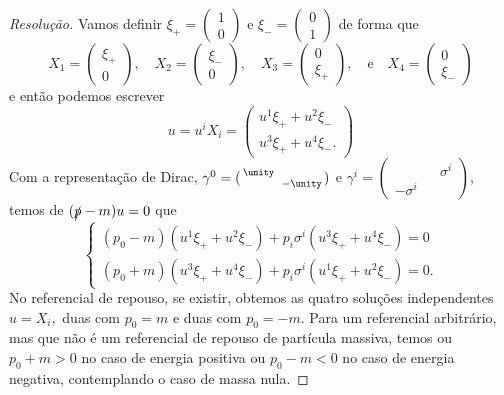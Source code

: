 \begin{proof}[Resolução]
    Vamos definir \(\xi_+ = (\begin{smallmatrix} 1\\0 \end{smallmatrix})\) e \(\xi_- = (\begin{smallmatrix}0\\1 \end{smallmatrix})\) de forma que
    \begin{equation*}
        X_1 = \begin{pmatrix}
            \xi_+\\0
        \end{pmatrix},\quad
        X_2 = \begin{pmatrix}
            \xi_-\\0
        \end{pmatrix},\quad
        X_3 = \begin{pmatrix}
            0\\\xi_+
        \end{pmatrix},\quad\text{e}\quad
        X_4 = \begin{pmatrix}
            0\\\xi_-
        \end{pmatrix}
    \end{equation*}
    e então podemos escrever
    \begin{equation*}
        u = u^i X_i = \begin{pmatrix}
            u^1 \xi_+ + u^2 \xi_-\\
            u^3 \xi_+ + u^4 \xi_-.
        \end{pmatrix}
    \end{equation*}
    Com a representação de Dirac, \(\gamma^0 = (\begin{smallmatrix} \unity &&\\ &&-\unity \end{smallmatrix})\) e \(\gamma^i = (\begin{smallmatrix} && \sigma^i\\ -\sigma^i && \end{smallmatrix})\), temos de \((\slashed{p} - m)u = 0\) que
    \begin{equation*}
        \begin{cases}
            (p_0 - m) (u^1 \xi_+ + u^2 \xi_-) + p_i \sigma^i (u^3 \xi_+ + u^4 \xi_-) = 0\\
            (p_0 + m) (u^3 \xi_+ + u^4 \xi_-) + p_i \sigma^i (u^1 \xi_+ + u^2 \xi_-) = 0.
        \end{cases}
    \end{equation*}
    No referencial de repouso, se existir, obtemos as quatro soluções independentes \(u = X_i,\) duas com \(p_0 = m\) e duas com \(p_0 = -m.\) Para um referencial arbitrário, mas que não é um referencial de repouso de partícula massiva, temos ou \(p_0 + m > 0\) no caso de energia positiva ou \(p_0 - m < 0\) no caso de energia negativa, contemplando o caso de massa nula. 


\end{proof}
